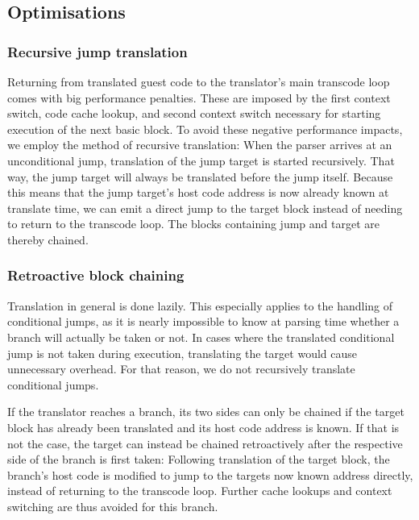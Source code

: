 \subsection{Optimisations}
\label{sec:optimise}

\subsubsection{Recursive jump translation}
\label{sec:recursive_translation}
Returning from translated guest code to the translator's main transcode loop comes with big performance penalties.
These are imposed by the first context switch, code cache lookup, and second context switch necessary for starting execution of the next basic block.
To avoid these negative performance impacts, we employ the method of recursive translation: When the parser arrives at an unconditional jump, translation of the jump target is started recursively.
That way, the jump target will always be translated before the jump itself.
Because this means that the jump target's host code address is now already known at translate time, we can emit a direct jump to the target block instead of needing to return to the transcode loop.
The blocks containing jump and target are thereby chained.

\subsubsection{Retroactive block chaining}
\label{sec:chaining}
Translation in general is done lazily.
This especially applies to the handling of conditional jumps, as it is nearly impossible to know at parsing time whether a branch will actually be taken or not.
In cases where the translated conditional jump is not taken during execution, translating the target would cause unnecessary overhead.
For that reason, we do not recursively translate conditional jumps.

If the translator reaches a branch, its two sides can only be chained if the target block has already been translated and its host code address is known.
If that is not the case, the target can instead be chained retroactively after the respective side of the branch is first taken: Following translation of the target block, the branch's host code is modified to jump to the targets now known address directly, instead of returning to the transcode loop.
Further cache lookups and context switching are thus avoided for this branch.

